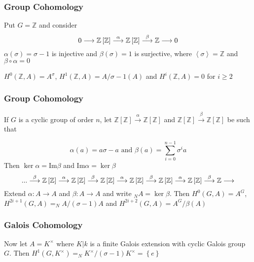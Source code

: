 \documentclass[10pt,xcolor=table,dvipsnames]{beamer}
\begin{document}
\begin{frame}
\frametitle{Group Cohomology}
Put $G=\mathbb{Z}$ and consider%
\begin{equation*}
0\longrightarrow \mathbb{Z}\left[ \mathbb{Z}\right] \overset{\alpha }{%
\longrightarrow }\mathbb{Z}\left[ \mathbb{Z}\right] \overset{\beta }{%
\longrightarrow }\mathbb{Z}\longrightarrow 0
\end{equation*}%
$\alpha \left( \sigma \right) =\sigma -1$ is injective and $\beta \left(
\sigma \right) =1$ is surjective, where $\left\langle \sigma \right\rangle =%
\mathbb{Z}$ and $\beta \circ \alpha =0$

\vspace{1cm}

$H^{0}\left( \mathbb{Z},A\right) =A^{\sigma }$, $H^{1}\left( \mathbb{Z}%
,A\right) =A/\sigma -1\left( A\right) $ and $H^{i}\left( \mathbb{Z},A\right)
=0$ for $i\geq 2$

\end{frame}

\begin{frame}
\frametitle{Group Cohomology}
If $G$ is a cyclic group of order $n$, let $\mathbb{Z}\left[ \mathbb{Z}%
\right] \overset{\alpha }{\longrightarrow }\mathbb{Z}\left[ \mathbb{Z}\right]
$ and $\mathbb{Z}\left[ \mathbb{Z}\right] \overset{\beta }{\longrightarrow }%
\mathbb{Z}\left[ \mathbb{Z}\right] $ be such that

\begin{equation*}
\alpha \left( a\right) =a\sigma -a\text{ and }\beta \left( a\right) =%
\underset{i=0}{\overset{n-1}{\sum }}\sigma ^{i}a
\end{equation*}%
Then $\ker \alpha =\text{Im}\beta $ and $\text{Im}\alpha =\ker \beta $%
\begin{equation*}
...\overset{\beta }{\longrightarrow }\mathbb{Z}\left[ \mathbb{Z}\right]
\overset{\alpha }{\longrightarrow }\mathbb{Z}\left[ \mathbb{Z}\right]
\overset{\beta }{\longrightarrow }\mathbb{Z}\left[ \mathbb{Z}\right] \overset%
{\alpha }{\longrightarrow }\mathbb{Z}\left[ \mathbb{Z}\right] \overset{\beta
}{\longrightarrow }\mathbb{Z}\left[ \mathbb{Z}\right] \overset{\alpha }{%
\longrightarrow }\mathbb{Z}\left[ \mathbb{Z}\right] \overset{\beta }{%
\longrightarrow }\mathbb{Z}\longrightarrow
\end{equation*}%
Extend $\alpha :A\longrightarrow A$ and $\beta :A\longrightarrow A$ and
write $_{N}A=\ker \beta $. Then $H^{0}\left( G,A\right) =A^{G}$, $%
H^{2i+1}\left( G,A\right) =_{N}A/\left( \sigma -1\right) A$ and $%
H^{2i+2}\left( G,A\right) =A^{G}/\beta \left( A\right) $

\end{frame}

\begin{frame}
\frametitle{Galois Cohomology}
Now let $A=K^{\times }$ where $K|k$ is a finite Galois extension with cyclic
Galois group $G$. Then $H^{1}\left( G,K^{\times }\right) =_{N}K^{\times
}/\left( \sigma -1\right) K^{\times }=\left\{ e\right\} $
\end{frame}
\end{document}
